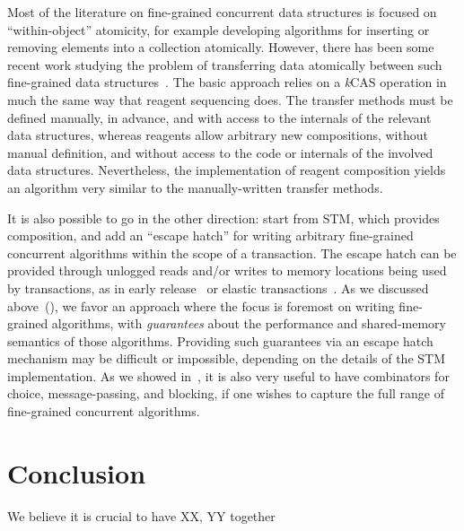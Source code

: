 \documentclass[preprint]{sigplanconf}
\begin{document}
Most of the literature on fine-grained concurrent data structures is focused
on ``within-object'' atomicity, for example developing algorithms for
inserting or removing elements into a collection atomically.  However, there
has been some recent work studying the problem of transferring data atomically
between such fine-grained data structures~\cite{Cederman2010}.  The basic
approach relies on a \emph{k}CAS operation in much the same way that reagent
sequencing does.  The transfer methods must be defined manually, in advance,
and with access to the internals of the relevant data structures, whereas
reagents allow arbitrary new compositions, without manual definition, and
without access to the code or internals of the involved data structures.
Nevertheless, the implementation of reagent composition yields an algorithm
very similar to the manually-written transfer methods.

It is also possible to go in the other direction: start from STM, which
provides composition, and add an ``escape hatch'' for writing arbitrary
fine-grained concurrent algorithms within the scope of a transaction.  The
escape hatch can be provided through unlogged reads and/or writes to memory
locations being used by transactions, as in early release~\cite{Herlihy2003}
or elastic transactions~\cite{Felber2009}.  As we discussed
above~(), we favor an approach where the focus is foremost on
writing fine-grained algorithms, with \emph{guarantees} about the performance
and shared-memory semantics of those algorithms.  Providing such guarantees
via an escape hatch mechanism may be difficult or impossible, depending on the
details of the STM implementation.  As we showed in~, it is
also very useful to have combinators for choice, message-passing, and
blocking, if one wishes to capture the full range of fine-grained concurrent
algorithms.

\section{Conclusion}

We believe it is crucial to have XX, YY together




\end{document}
